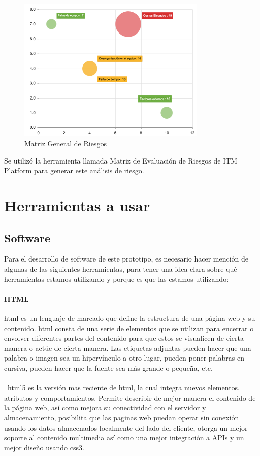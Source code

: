 \documentclass[12pt, a4paper, titlepage]{report}
\begin{document}
    	\begin{figure}[H]
    		\includegraphics[width=9cm]{./imagenes/Analisis/AnalisisRiesgo/analisisriesgos.png}
    		\centering 
    		\caption{Matriz General de Riesgos}
    	\end{figure}
    
    	Se utilizó la herramienta llamada Matriz de Evaluación de Riesgos de ITM Platform para generar este análisis de riesgo. \cite{refMatrizEvaluacionRiesgos}
    	    
    	\section{Herramientas a usar}
			\subsection{Software}
			Para el desarrollo de software de este prototipo, es necesario hacer mención de algunas de las siguientes herramientas, para tener una idea clara sobre qué herramientas estamos utilizando y porque es que las estamos utilizando:
			
			\paragraph{HTML\\}
			
			\acrfull{html} es un lenguaje de marcado que define la estructura de una página web y su contenido. \acrshort{html} consta de una serie de elementos que se utilizan para encerrar o envolver diferentes partes del contenido para que estos se visualicen de cierta manera o actúe de cierta manera. Las etiquetas adjuntas pueden hacer que una palabra o imagen sea un hipervínculo a otro lugar, pueden poner palabras en cursiva, pueden hacer que la fuente sea más grande o pequeña, etc. \cite{refHtml} \\\\\
			\acrshort{html}5 es la versión mas reciente de html, la cual integra nuevos elementos, atributos y comportamientos. Permite describir de mejor manera el contenido de la página web, así como mejora su conectividad con el servidor y almacenamiento, posibilita que las paginas web puedan operar sin conexión usando los datos almacenados localmente del lado del cliente, otorga un mejor soporte al contenido multimedia así como una mejor integración a APIs y un mejor diseño usando \acrshort{css}3.	\cite{refHtml2}		
			
\end{document}
